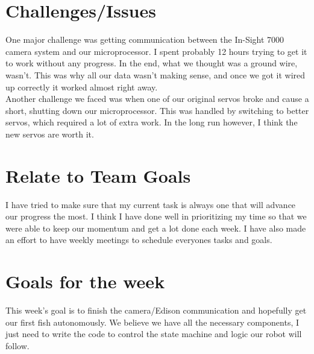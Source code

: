 \documentclass[a4paper, 11pt]{article}
\begin{document}
\section*{Challenges/Issues}
One major challenge was getting communication between the In-Sight 7000 camera system and our microprocessor. I spent probably 12 hours trying to get it to work without any progress. In the end, what we thought was a ground wire, wasn't. This was why all our data wasn't making sense, and once we got it wired up correctly it worked almost right away.\\

\noindent Another challenge we faced was when one of our original servos broke and cause a short, shutting down our microprocessor. This was handled by switching to better servos, which required a lot of extra work. In the long run however, I think the new servos are worth it.

\section*{Relate to Team Goals}
I have tried to make sure that my current task is always one that will advance our progress the most. I think I have done well in prioritizing my time so that we were able to keep our momentum and get a lot done each week. I have also made an effort to have weekly meetings to schedule everyones tasks and goals.

\section*{Goals for the week}
This week's goal is to finish the camera/Edison communication and hopefully get our first fish autonomously. We believe we have all the necessary components, I just need to write the code to control the state machine and logic our robot will follow.

\end{document}
